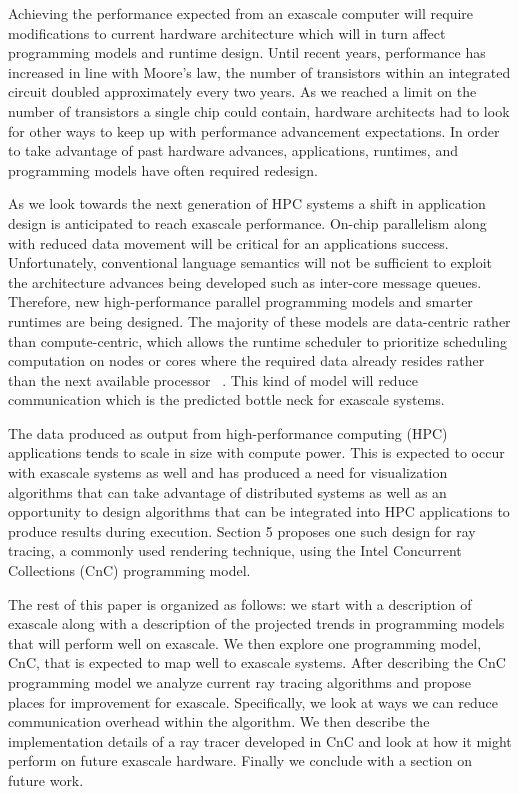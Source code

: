 
Achieving the performance expected from an exascale computer will require modifications to current hardware architecture which will in turn affect programming models and runtime design. Until recent years, performance has increased in line with Moore's law, the number of transistors within an integrated circuit doubled approximately every two years. As we reached a limit on the number of transistors a single chip could contain, hardware architects had to look for other ways to keep up with performance advancement expectations. In order to take advantage of past hardware advances, applications, runtimes, and programming models have often required redesign. 

As we look towards the next generation of HPC systems a shift in application design is anticipated to reach exascale performance. On-chip parallelism along with reduced data movement will be critical for an applications success. Unfortunately, conventional language semantics will not be sufficient to exploit the architecture advances being developed such as inter-core message queues. Therefore, new high-performance parallel programming models and smarter runtimes are being designed. The majority of these models are data-centric rather than compute-centric, which allows the runtime scheduler to prioritize scheduling computation on nodes or cores where the required data already resides rather than the next available processor ~\cite{kogge2013exascale}. This kind of model will reduce communication which is the predicted bottle neck for exascale systems.

The data produced as output from high-performance computing (HPC) applications tends to scale in size with compute power. This is expected to occur with exascale systems as well and has produced a need for visualization algorithms that can take advantage of distributed systems as well as an opportunity to design algorithms that can be integrated into HPC applications to produce results during execution. Section 5 proposes one such design for ray tracing, a commonly used rendering technique, using the Intel Concurrent Collections (CnC) programming model. 

The rest of this paper is organized as follows: we start with a description of exascale along with a description of the projected trends in programming models that will perform well on exascale.  We then explore one programming model, CnC, that is expected to map well to exascale systems.  After describing the CnC programming model we analyze current ray tracing algorithms and propose places for improvement for exascale.  Specifically, we look at ways we can reduce communication overhead within the algorithm.  We then describe the implementation details of a ray tracer developed in CnC and look at how it might perform on future exascale hardware.  Finally we conclude with a section on future work.

